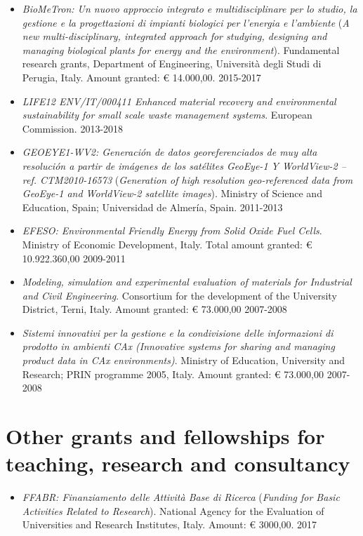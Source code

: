 \documentclass[11pt]{article}
\begin{document}
\begin{itemize}
	\item \emph{BioMeTron: Un nuovo approccio integrato e multidisciplinare per lo studio, la gestione e la progettazioni di impianti biologici per l'energia e l'ambiente} (\emph{A new multi-disciplinary, integrated approach for studying, designing and managing biological plants for energy and the environment}). Fundamental research grants, Department of Engineering, Università degli Studi di Perugia, Italy. Amount granted: € 14.000,00. \hfill 2015-2017

	\item \emph{LIFE12 ENV/IT/000411 Enhanced material recovery and environmental sustainability for small scale waste management systems}. European Commission. \hfill 2013-2018
	
	\item \emph{GEOEYE1-WV2: Generación de datos georeferenciados de muy alta resolución a partir de imágenes de los satélites GeoEye-1 Y WorldView-2 -- ref. CTM2010-16573} (\emph{Generation of high resolution geo-referenced data from GeoEye-1 and WorldView-2 satellite images}). Ministry of Science and Education, Spain; Universidad de Almería, Spain. \hfill 2011-2013
	
	\item \emph{EFESO: Environmental Friendly Energy from Solid Oxide Fuel Cells}. Ministry of Economic Development, Italy. Total amount granted: € 10.922.360,00 \hfill 2009-2011
	
	\item \emph{Modeling, simulation and experimental evaluation of materials for Industrial and Civil Engineering}. Consortium for the development of the University District, Terni, Italy. Amount granted: € 73.000,00 \hfill 2007-2008
	
	\item \emph{Sistemi innovativi per la gestione e la condivisione delle informazioni di prodotto in ambienti CAx (Innovative systems for sharing and managing product data in CAx environments)}. Ministry of Education, University and Research; PRIN programme 2005, Italy. Amount granted: € 73.000,00 \mbox{} \hfill 2007-2008

\end{itemize}

\section*{Other grants and fellowships for teaching, research and consultancy}

\begin{itemize}
	\item \emph{FFABR: Finanziamento delle Attività Base di Ricerca} (\emph{Funding for Basic Activities Related to Research}). National Agency 
for the Evaluation of Universities and Research Institutes, Italy. Amount: € 3000,00. \hfill 2017
\end{itemize}
\end{document}

